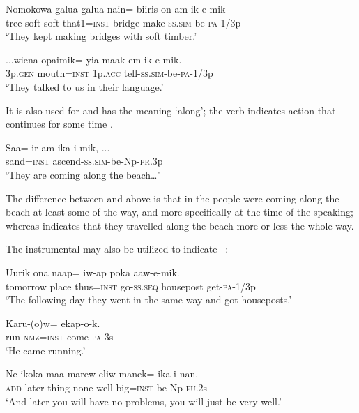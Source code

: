 \ea%
\label{ex:3:x766}
\gll Nomokowa galua-galua nain= biiris on-am-ik-e-mik \\
tree soft-soft that1=\textsc{inst} bridge make-\textsc{ss}.\textsc{sim}-be-\textsc{pa}-1/3p\\
\glt`They kept making bridges with soft timber.'
\z

\ea%
\label{ex:3:x768}
\gll ...wiena opaimik= yia maak-em-ik-e-mik. \\
3p.\textsc{gen} mouth=\textsc{inst} 1p.\textsc{acc} tell-\textsc{ss}.\textsc{sim}-be-\textsc{pa}-1/3p\\
\glt`They talked to us in their language.'
\z

It is also used for  and has the meaning `along'; the verb indicates action that continues for some time .

\ea%
\label{ex:3:x767}
\gll Saa= ir-am-ika-i-mik, ... \\
sand=\textsc{inst} ascend-\textsc{ss}.\textsc{sim}-be-Np-\textsc{pr}.3p\\
\glt`They are coming along the beach{\dots}'
\z

The difference between  and  above is that in  the people were coming along the beach at least some of the way, and more specifically at the time of the speaking; whereas  indicates that they travelled along the beach more or less the whole way.

The instrumental may also be utilized to indicate  --: 

\ea%
\label{ex:3:x1881}
\gll Uurik ona naap= iw-ap poka aaw-e-mik. \\
tomorrow place thus=\textsc{inst} go-\textsc{ss}.\textsc{seq} housepost get-\textsc{pa}-1/3p\\
\glt`The following day they went in the same way and got houseposts.'
\z

\ea%
\label{ex:3:x773}
\gll Karu-(o)w= ekap-o-k. \\
run-\textsc{nmz}=\textsc{inst} come-\textsc{pa}-3s\\
\glt`He came running.'
\z

\ea%
\label{ex:3:x1814}
\gll Ne ikoka maa marew eliw  manek= ika-i-nan. \\
\textsc{add} later thing none well big=\textsc{inst} be-Np-\textsc{fu}.2s\\
\glt`And later you will have no problems, you will just be very well.'
\z

